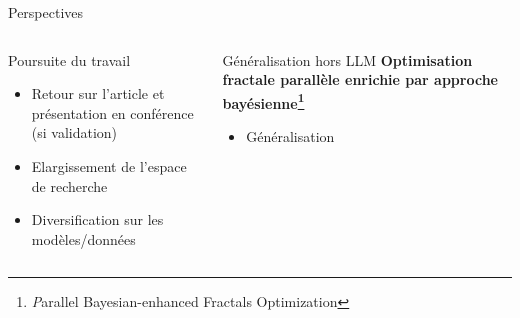 
\begin{frame}{Perspectives}
    \begin{columns}
        
        \begin{column}[t]{0.45\textwidth} 
            \begin{block}{Poursuite du travail}
                \begin{itemize}
                    \item Retour sur l'article et présentation en conférence (si validation)
                    \item Elargissement de l'espace de recherche
                    \item Diversification sur les modèles/données
                \end{itemize}                
            \end{block}

        \end{column}  
            \begin{column}[t]{0.45\textwidth}
                \begin{block}{Généralisation hors LLM}
                    \textbf{Optimisation fractale parallèle enrichie par approche bayésienne\footnote[3]{\textit Parallel Bayesian-enhanced Fractals Optimization}}

                    \begin{itemize}
                        \item Généralisation 
                    \end{itemize}
                \end{block}
            \end{column}
        
                 
    \end{columns}
    
\end{frame}